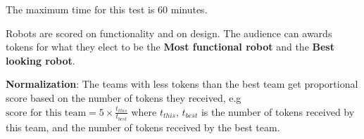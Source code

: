 The maximum time for this test is 60 minutes.

Robots are scored on functionality and on design.
The audience can awards tokens for what they elect to be the \textbf{Most functional robot} and the \textbf{Best looking robot}.

\begin{scorelist}

	

\end{scorelist}

\textbf{Normalization}: The teams with less tokens than the best team get proportional score based
on the number of tokens they received, e.g 
$\text{score for this team} = 5 \times \frac{t_{this}}{t_{best}}$
where $t_{this}$, $t_{best}$ is the number of tokens received by this team, and the number of tokens received by the best team.


